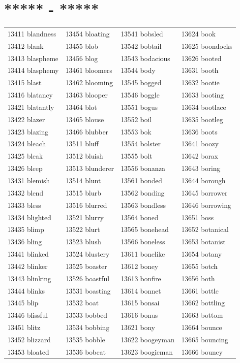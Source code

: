 \documentclass[10pt, oneside]{book}
\begin{document}
\begin{table}
	\centering
	\section*{***** - *****}
	\begin{tabular}{l l l l}
13411 blandness &13454 bloating &13541 bobsled &13624 book\\
13412 blank &13455 blob &13542 bobtail &13625 boondocks\\
13413 blaspheme &13456 blog &13543 bodacious &13626 booted\\
13414 blasphemy &13461 bloomers &13544 body &13631 booth\\
13415 blast &13462 blooming &13545 bogged &13632 bootie\\
13416 blatancy &13463 blooper &13546 boggle &13633 booting\\
13421 blatantly &13464 blot &13551 bogus &13634 bootlace\\
13422 blazer &13465 blouse &13552 boil &13635 bootleg\\
13423 blazing &13466 blubber &13553 bok &13636 boots\\
13424 bleach &13511 bluff &13554 bolster &13641 boozy\\
13425 bleak &13512 bluish &13555 bolt &13642 borax\\
13426 bleep &13513 blunderer &13556 bonanza &13643 boring\\
13431 blemish &13514 blunt &13561 bonded &13644 borough\\
13432 blend &13515 blurb &13562 bonding &13645 borrower\\
13433 bless &13516 blurred &13563 bondless &13646 borrowing\\
13434 blighted &13521 blurry &13564 boned &13651 boss\\
13435 blimp &13522 blurt &13565 bonehead &13652 botanical\\
13436 bling &13523 blush &13566 boneless &13653 botanist\\
13441 blinked &13524 blustery &13611 bonelike &13654 botany\\
13442 blinker &13525 boaster &13612 boney &13655 botch\\
13443 blinking &13526 boastful &13613 bonfire &13656 both\\
13444 blinks &13531 boasting &13614 bonnet &13661 bottle\\
13445 blip &13532 boat &13615 bonsai &13662 bottling\\
13446 blissful &13533 bobbed &13616 bonus &13663 bottom\\
13451 blitz &13534 bobbing &13621 bony &13664 bounce\\
13452 blizzard &13535 bobble &13622 boogeyman &13665 bouncing\\
13453 bloated &13536 bobcat &13623 boogieman &13666 bouncy\\
	\end{tabular}
 \end{table}
\end{document}
